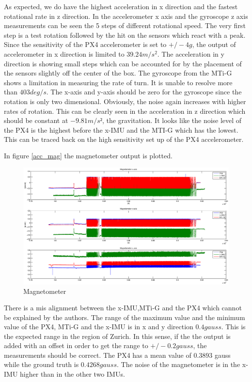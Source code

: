 As expected, we do have the highest acceleration in x direction and the fastest rotational rate in z direction. In the accelerometer x axis and the gyroscope z axis measurements can be seen the 5 steps of different rotational speed. The very first step is a test rotation followed by the hit on the sensors which react with a peak. Since the sensitivity of the PX4 accelerometer is set to $+/- 4 g$, the output of accelerometer in x direction is limited to $39.24 m/s^2$. The acceleration in y direction is showing small steps which can be accounted for by the placement of the sensors slightly off the center of the box. The gyroscope from the MTi-G shows a limitation in measuring the rate of turn. It is unable to resolve more than $ 403 deg/s$. The x-axis and y-axis should be zero for the gyroscope since the rotation is only two dimensional. Obviously, the noise again increases with higher rates of rotation. This can be clearly seen in the acceleration in z direction which should be constant at $-9.81 m/s²$, the gravitation. It looks like the noise level of the PX4 is the highest before the x-IMU and the MTI-G which has the lowest. This can be traced back on the high sensitivity set up of the PX4 accelerometer.


In figure \ref{acc_mag} the magnetometer output is plotted.
\begin{figure}[h]
\includegraphics[width=1.2\textwidth]{pictures/ct_mag.eps}
\caption{Magnetometer}
\label{ct_mag}
\end{figure}
There is a mis alignment between the x-IMU,MTi-G and the PX4 which cannot be explained by the authors. The range of the maximum value and the minimum value of the PX4, MTi-G and the x-IMU is in x and y direction $0.4 gauss$. This is the expected range in the region of Zurich. In this sense, if the the output is added with an offset in order to get the range to $+/- 0.2 gauss$, the measurements should be correct. The PX4 has a mean value of $0.3893$ gauss while the ground truth is $0.4268 gauss$.  The noise of the magnetometer is in the x-IMU higher than in the other two IMUs.

